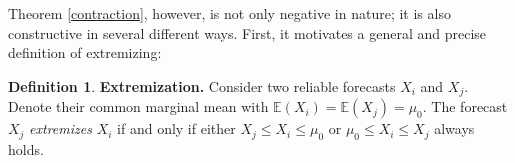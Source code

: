 \documentclass[12pt]{article}
\newcommand{\E}{\mathbb{E}}
\theoremstyle{definition}
\theoremstyle{definition}
\newtheorem{definition}[theorem]{Definition}
\def\E{{\mathbb E}}
\begin{document}

%


Theorem \ref{contraction}, however, is not only negative in nature; it is also  constructive in several different ways. First, 
it motivates a general and precise definition of extremizing:
\begin{definition} \label{extrem}
\textbf{Extremization.}
Consider two reliable forecasts $X_i$ and $X_j$. Denote their common marginal mean with $\E(X_i) = \E(X_j) = \mu_0$. The forecast $X_j$ \textit{extremizes} $X_i$ if and only if either $X_j \leq X_i \leq \mu_0$ or $\mu_0 \leq X_i \leq X_j $ always holds.
\end{definition}
\end{document}
